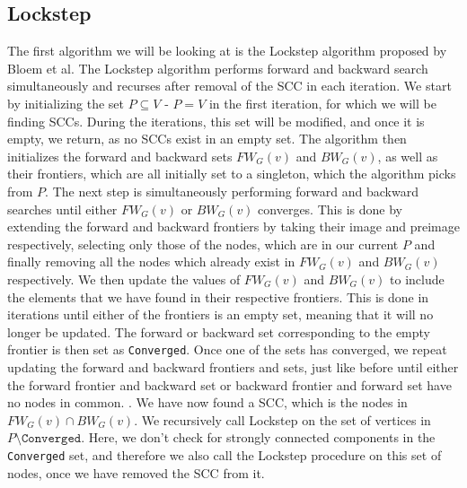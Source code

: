\documentclass[../master.tex]{subfiles}
\newcommand{\FW}[2][G]{\ensuremath{FW_{#1}(#2)}}
\newcommand{\BW}[2][G]{\ensuremath{BW_{#1}(#2)}}
\begin{document}
\subsection{Lockstep}
The first algorithm we will be looking at is the Lockstep algorithm proposed by Bloem et al. \cite{lockstep} The Lockstep algorithm performs forward and backward search simultaneously and recurses after removal of the SCC in each iteration.
We start by initializing the set $P\subseteq V$ - $P=V$ in the first iteration, for which we will be finding SCCs. During the iterations, this set will be modified, and once it is empty, we return, as no SCCs exist in an empty set. The algorithm then initializes the forward and backward sets \FW{v} and \BW{v}, as well as their frontiers, which are all initially set to a singleton, which the algorithm picks from $P$.
The next step is simultaneously performing forward and backward searches until either \FW{v} or \BW{v} converges. This is done by extending the forward and backward frontiers by taking their image and preimage respectively, selecting only those of the nodes, which are in our current $P$ and finally removing all the nodes which already exist in \FW{v} and \BW{v} respectively. We then update the values of \FW{v} and \BW{v} to include the elements that we have found in their respective frontiers. This is done in iterations until either of the frontiers is an empty set, meaning that it will no longer be updated. The forward or backward set corresponding to the empty frontier is then set as \texttt{Converged}.
Once one of the sets has converged, we repeat updating the forward and backward frontiers and sets, just like before until either the forward frontier and backward set or backward frontier and forward set have no nodes in common. .
We have now found a SCC, which is the nodes in $\FW{v}\cap\BW{v}$. 
We recursively call Lockstep on the set of vertices in $P\setminus \texttt{Converged}$. Here, we don't check for strongly connected components in the \texttt{Converged} set, and therefore we also call the Lockstep procedure on this set of nodes, once we have removed the SCC from it.
\end{document}

